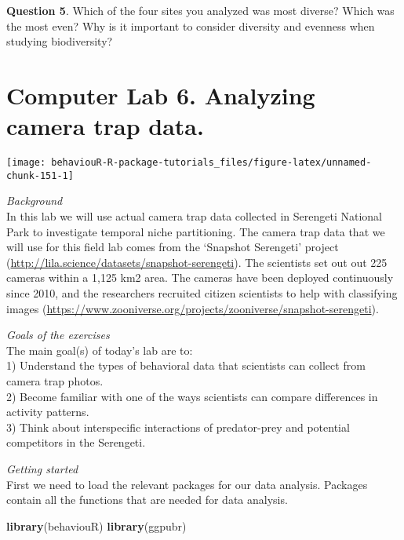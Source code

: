 \documentclass[]{book}
\newenvironment{Shaded}{\begin{snugshade}}{\end{snugshade}}
\newcommand{\KeywordTok}[1]{\textcolor[rgb]{0.13,0.29,0.53}{\textbf{#1}}}
\newcommand{\NormalTok}[1]{#1}
\begin{document}
\textbf{Question 5}. Which of the four sites you analyzed was most diverse? Which was the most even? Why is it important to consider diversity and evenness when studying biodiversity?

\hypertarget{computer-lab-6.-analyzing-camera-trap-data.}{%
\chapter*{Computer Lab 6. Analyzing camera trap data.}\label{computer-lab-6.-analyzing-camera-trap-data.}}

\begin{center}\texttt{[image: behaviouR-R-package-tutorials\_files/figure-latex/unnamed-chunk-151-1]} \end{center}

\emph{Background}\\
In this lab we will use actual camera trap data collected in Serengeti National Park to investigate temporal niche partitioning. The camera trap data that we will use for this field lab comes from the `Snapshot Serengeti' project (\url{http://lila.science/datasets/snapshot-serengeti}). The scientists set out out 225 cameras within a 1,125 km2 area. The cameras have been deployed continuously since 2010, and the researchers recruited citizen scientists to help with classifying images (\url{https://www.zooniverse.org/projects/zooniverse/snapshot-serengeti}).

\emph{Goals of the exercises}\\
The main goal(s) of today's lab are to:\\
1) Understand the types of behavioral data that scientists can collect from camera trap photos.\\
2) Become familiar with one of the ways scientists can compare differences in activity patterns.\\
3) Think about interspecific interactions of predator-prey and potential competitors in the Serengeti.

\emph{Getting started}\\
First we need to load the relevant packages for our data analysis. Packages contain all the functions that are needed for data analysis.

\begin{Shaded}
\begin{Highlighting}[]
\KeywordTok{library}\NormalTok{(behaviouR)}
\KeywordTok{library}\NormalTok{(ggpubr)}
\end{Highlighting}
\end{Shaded}
\end{document}
